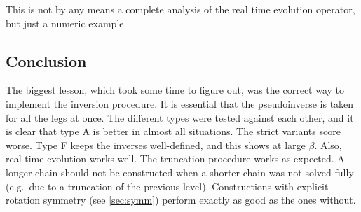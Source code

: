 This is not by any means a complete analysis of the real time evolution operator, but just a numeric example.

\subsection{Conclusion}

The biggest lesson, which took some time to figure out, was the correct way to implement the inversion procedure. It is essential that the pseudoinverse is taken for all the legs at once. The different types were tested against each other, and it is clear that type A is better in almost all situations. The strict variants score worse. Type F keeps the inverses well-defined, and this shows at large $\beta$. Also, real time evolution works well. The truncation procedure works as expected. A longer chain should not be constructed when a shorter chain was not solved fully (e.g.\ due to a truncation of the previous level). Constructions with explicit rotation symmetry (see \cref{sec:symm}) perform exactly as good as the ones without.